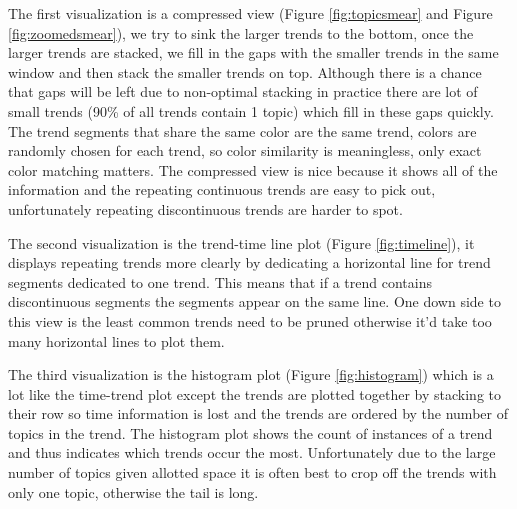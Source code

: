\documentclass[times, 10pt,twocolumn]{article}
\begin{document}
The first visualization is a compressed view (Figure \ref{fig:topicsmear}
and Figure \ref{fig:zoomedsmear}), we try to sink the
larger trends to the bottom, once the larger trends are stacked, we
fill in the gaps with the smaller trends in the same window and then
stack the smaller trends on top. Although there is a chance that gaps
will be left due to non-optimal stacking in practice there are lot of
small trends (90\% of all trends contain 1 topic) which fill in these
gaps quickly. The trend segments that share the same color are the
same trend, colors are randomly chosen for each trend, so color
similarity is meaningless, only exact color matching matters.
The compressed view is nice because it shows all of the
information and the repeating continuous trends are easy to pick out,
unfortunately repeating discontinuous trends are harder to spot.

The second visualization is the trend-time line plot (Figure
\ref{fig:timeline}), it displays repeating trends more clearly by
dedicating a horizontal line for trend segments dedicated to one
trend. This means that if a trend contains discontinuous segments the
segments appear on the same line. One down side to this view is the
least common trends need to be pruned otherwise it'd take too many
horizontal lines to plot them.

The third visualization is the histogram plot (Figure
\ref{fig:histogram}) which is a lot like the time-trend plot except
the trends are plotted together by stacking to their row so time
information is lost and the trends are ordered by the number of topics
in the trend. The histogram plot shows the count of instances of a
trend and thus indicates which trends occur the most. Unfortunately
due to the large number of topics given allotted space it is often
best to crop off the trends with only one topic, otherwise the tail is
long.
\end{document}
